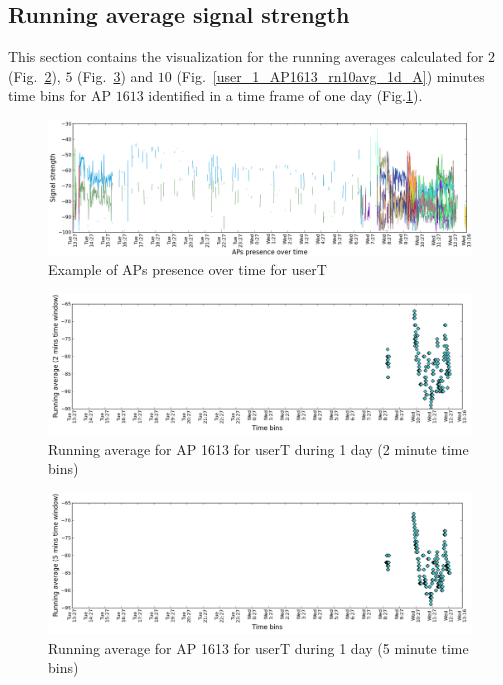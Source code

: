 \subsection{Running average signal strength}
\label{appendix_rn_avg}

This section contains the visualization for the running averages calculated for
$2$ (Fig.~\ref{user_1_AP1613_rn2avg_1d_A}), $5$
(Fig.~\ref{user_1_AP1613_rn5avg_1d_A}) and $10$
(Fig.~\ref{user_1_AP1613_rn10avg_1d_A}) minutes time bins for AP $1613$
identified in a time frame of one day (Fig.\ref{user_1_APs_1d_ap_A}).

\begin{figure}[!h]
\centering
\includegraphics[width
=\textwidth]{figures/rn_avg/user_1_sorted_1days_plot.png}
\caption{Example of APs presence over time for userT}
\label{user_1_APs_1d_ap_A}
\end{figure}

\begin{figure}[!h]
\centering
\includegraphics[width
=\textwidth]{figures/rn_avg/user_1_sorted_1days_plot_1613_rn_avg_sig_2.png}
\caption{Running average for AP 1613 for userT during 1 day (2 minute time
bins)}
\label{user_1_AP1613_rn2avg_1d_A}
\end{figure}

\begin{figure}[!h]
\centering
\includegraphics[width
=\textwidth]{figures/rn_avg/user_1_sorted_1days_plot_1613_rn_avg_sig_5.png}
\caption{Running average for AP 1613 for userT during 1 day (5 minute time
bins)}
\label{user_1_AP1613_rn5avg_1d_A}
\end{figure}

